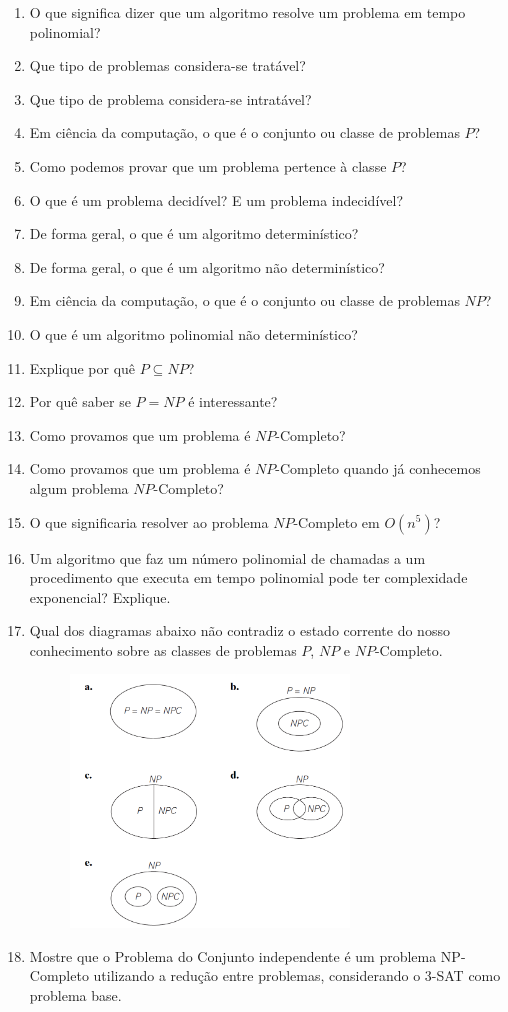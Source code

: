 \documentclass{article}
\begin{document}
\begin{enumerate}
    \item O que significa dizer que um algoritmo resolve um problema em tempo polinomial?
    \item Que tipo de problemas considera-se tratável?
    \item Que tipo de problema considera-se intratável?
    \item Em ciência da computação, o que é o conjunto ou classe de problemas $P$?
    \item Como podemos provar que um problema pertence à classe $P$?
    \item O que é um problema decidível? E um problema indecidível?
    \item De forma geral, o que é um algoritmo determinístico?
    \item De forma geral, o que é um algoritmo não determinístico?
    \item Em ciência da computação, o que é o conjunto ou classe de problemas $NP$?
    \item O que é um algoritmo polinomial não determinístico?
    \item Explique por quê $P \subseteq NP$?
    \item Por quê saber se $P=NP$ é interessante?
    \item Como provamos que um problema é $NP$-Completo?
    \item Como provamos que um problema é $NP$-Completo quando já conhecemos algum problema $NP$-Completo?
    \item O que significaria resolver ao problema $NP$-Completo em $O(n^5)$?
    \item Um algoritmo que faz um número polinomial de chamadas a um procedimento que executa em tempo polinomial pode ter complexidade exponencial? Explique.
    \item Qual dos diagramas abaixo não contradiz o estado corrente do nosso conhecimento sobre as classes de problemas $P$, $NP$ e $NP$-Completo.
        \begin{figure}[!ht]
        \centering
        \includegraphics[width=0.7\textwidth]{Capture.PNG}
        \label{fig:my_label}
    \end{figure}
    \item Mostre que o Problema do Conjunto independente é um problema NP-Completo utilizando a redução entre problemas, considerando o 3-SAT como problema base.
    
\end{enumerate}



%
%
\end{document}
